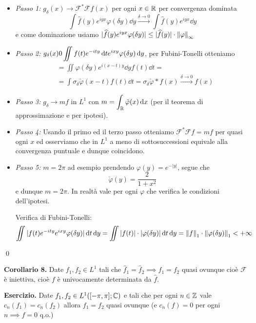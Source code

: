 \begin{itemize}
	\item \textit{Passo 1:}
		$g_\delta(x) \to \mathcal F^* \mathcal F f(x)$ per ogni $x \in \mathbb R$ per convergenza dominata
		$$
		\int \hat f(y) e^{iyx} \varphi(\delta y) \dd y \xrightarrow{\delta \to 0} 
		\int \hat f(y) e^{iyx} \dd y
		$$
		e come dominazione usiamo $|\widehat f(y) e^{iyx} \varphi(\delta y)| \leq |\widehat f(y)| \cdot \left\lVert \varphi \right\rVert_\infty$

	\item \textit{Passo 2:}
		$\displaystyle g_\delta(x) 0 \iint f(t) e^{-ity} \,\mathrm{d} t e^{ixy} \varphi(\delta y) \,\mathrm{d} y$, per Fubini-Tonelli otteniamo
			$$
			\begin{aligned}
				&= \iint \varphi(\delta y) e^{i(x-t)y} \dd y f(t) \dd t = \\
				&= \int \sigma_\delta \check \varphi(x - t) f(t) \dd t = \sigma_\delta \check \varphi \ast f(x) \xrightarrow{\delta \to 0} f(x)
			\end{aligned}
			$$
	\item \textit{Passo 3:}
		$g_\delta \to m f$ in $L^1$ con $\displaystyle m = \int_\mathbb R \check \varphi(x) \,\mathrm{d} x$ (per il teorema di approssimazione e per ipotesi).

	\item \textit{Passo 4:}
		Usando il primo ed il terzo passo otteniamo $\mathcal F^* \mathcal F f = m f$ per quasi ogni $x$ ed osserviamo che in $L^1$ a meno di sottosuccessioni equivale alla convergenza puntuale e dunque coincidono.

	\item \textit{Passo 5:}
		$m = 2\pi$ ad esempio prendendo $\varphi(y) = e^{-|y|}$, segue che
		$$
		\check \varphi(y) = \frac{2}{1 + x^2}
		$$
		e dunque $m = 2\pi$. In realtà vale per ogni $\varphi$ che verifica le condizioni dell'ipotesi.

		Verifica di Fubini-Tonelli:
		$$
		\iint |f(t) e^{-ity} e^{ixy} \varphi(\delta y)| \,\mathrm{d} t \,\mathrm{d} y = \iint |f(t)| \cdot |\varphi(\delta y)| \,\mathrm{d} t \,\mathrm{d} y = \left\lVert f \right\rVert_1 \cdot \left\lVert \varphi(\delta y) \right\rVert_1 < +\infty
		$$
\end{itemize}
\qed

\textbf{Corollario 8.}
Date $f_1, f_2 \in L^1$ tali che $\hat f_1 = \hat f_2 \implies f_1 = f_2$ quasi ovunque cioè $\mathcal F$ è iniettiva, cioè $f$ è univocamente determinata da $\hat f$.

\textbf{Esercizio.}
Date $f_1, f_2 \in L^1([-\pi, \pi]; \mathbb C)$ e tali che per ogni $n \in \mathbb Z$ vale $c_n(f_1) = c_n(f_2)$ allora $f_1 = f_2$ quasi ovunque (e $c_n(f) = 0$ per ogni $n \implies f = 0$ q.o.)









